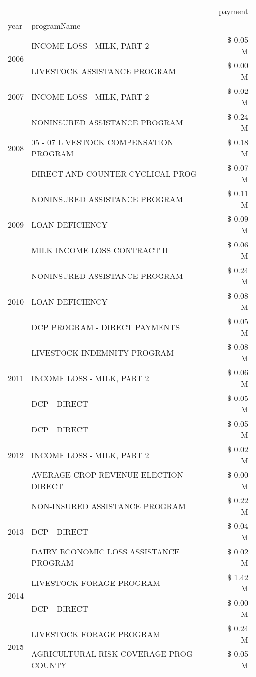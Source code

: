 \begin{tabular}{llr}
\toprule
 &  & payment \\
year & programName &  \\
\midrule
\multirow[t]{2}{*}{2006} & INCOME LOSS - MILK, PART 2 & \$ 0.05 M \\
 & LIVESTOCK ASSISTANCE PROGRAM & \$ 0.00 M \\
\cline{1-3}
2007 & INCOME LOSS - MILK, PART 2 & \$ 0.02 M \\
\cline{1-3}
\multirow[t]{3}{*}{2008} & NONINSURED ASSISTANCE PROGRAM & \$ 0.24 M \\
 & 05 - 07 LIVESTOCK COMPENSATION PROGRAM & \$ 0.18 M \\
 & DIRECT AND COUNTER CYCLICAL PROG & \$ 0.07 M \\
\cline{1-3}
\multirow[t]{3}{*}{2009} & NONINSURED ASSISTANCE PROGRAM & \$ 0.11 M \\
 & LOAN DEFICIENCY & \$ 0.09 M \\
 & MILK INCOME LOSS CONTRACT II & \$ 0.06 M \\
\cline{1-3}
\multirow[t]{3}{*}{2010} & NONINSURED ASSISTANCE PROGRAM & \$ 0.24 M \\
 & LOAN DEFICIENCY & \$ 0.08 M \\
 & DCP PROGRAM - DIRECT PAYMENTS & \$ 0.05 M \\
\cline{1-3}
\multirow[t]{3}{*}{2011} & LIVESTOCK INDEMNITY PROGRAM & \$ 0.08 M \\
 & INCOME LOSS - MILK, PART 2 & \$ 0.06 M \\
 & DCP - DIRECT & \$ 0.05 M \\
\cline{1-3}
\multirow[t]{3}{*}{2012} & DCP - DIRECT & \$ 0.05 M \\
 & INCOME LOSS - MILK, PART 2 & \$ 0.02 M \\
 & AVERAGE CROP REVENUE ELECTION-DIRECT & \$ 0.00 M \\
\cline{1-3}
\multirow[t]{3}{*}{2013} & NON-INSURED ASSISTANCE PROGRAM & \$ 0.22 M \\
 & DCP - DIRECT & \$ 0.04 M \\
 & DAIRY ECONOMIC LOSS ASSISTANCE PROGRAM & \$ 0.02 M \\
\cline{1-3}
\multirow[t]{2}{*}{2014} & LIVESTOCK FORAGE PROGRAM & \$ 1.42 M \\
 & DCP - DIRECT & \$ 0.00 M \\
\cline{1-3}
\multirow[t]{3}{*}{2015} & LIVESTOCK FORAGE PROGRAM & \$ 0.24 M \\
 & AGRICULTURAL RISK COVERAGE PROG - COUNTY & \$ 0.05 M \\

\end{tabular}
